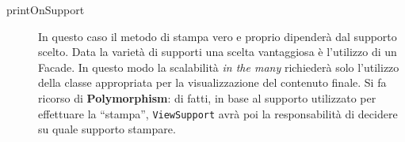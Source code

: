 \begin{description}
\item[printOnSupport]

In questo caso il metodo di stampa vero e proprio dipenderà dal supporto scelto. 
Data la varietà di supporti una scelta vantaggiosa è l'utilizzo di un Facade. 
In questo modo la scalabilità \textit{in the many} richiederà solo l'utilizzo della
classe appropriata per la visualizzazione del contenuto finale.
Si fa ricorso di \textbf{Polymorphism}: di fatti, in base al supporto utilizzato
per effettuare la ``stampa'', \texttt{ViewSupport} avrà poi la responsabilità di 
decidere su quale supporto stampare.

\begin{figure}[!thp]
 \centering
   \\
   \\
   \\

\end{figure}
\end{description}
